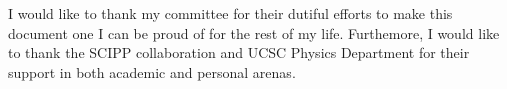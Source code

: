 I would like to thank my committee for their dutiful efforts to make this
document one I can be proud of for the rest of my life.  Furthemore, I would
like to thank the SCIPP collaboration and UCSC Physics Department for their
support in both academic and personal arenas.
